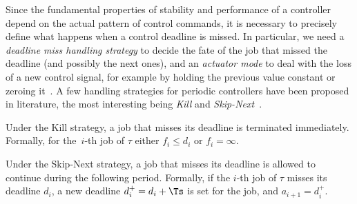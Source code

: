 Since the fundamental properties of stability and performance of a controller depend on the actual pattern of control commands, it is necessary to precisely define what happens when a control deadline is missed.
In particular, we need a \emph{deadline miss handling strategy} to decide the fate of the job that missed the deadline (and possibly the next ones), and an \emph{actuator mode} to deal with the loss of a new control signal, for example by holding the previous value constant or zeroing it~\cite{schenato09}.
A few handling strategies for periodic controllers have been proposed in literature, the most interesting being \emph{Kill} and \emph{Skip-Next}~\cite{Cervin:2005,Pazzaglia:2019,Maggio:2020}.

\begin{definition}%
    \label{def:kill}%
    Under the Kill strategy, a job that misses its deadline is terminated immediately. 
    Formally, for the~$i$-th job of $\tau$ either $f_i\leq d_i$ or $f_i=\infty$.
\end{definition}

\begin{definition}%
    \label{def:skip}%
    Under the Skip-Next strategy, a job that misses its deadline is allowed to continue during the following period.
    Formally, if the $i$-th job of $\tau$ misses its deadline $d_i$, a new deadline $d^{+}_i = d_i + \Ts$ is set for the job, and $a_{i+1} = d^{+}_i$.
\end{definition}



